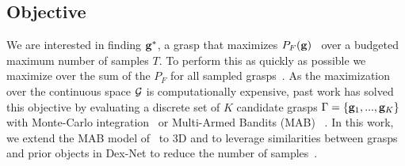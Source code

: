 \subsection{Objective}
We are interested in finding $\mathbf{g}^*$, a grasp that maximizes $P_F(\mathbf{g})$~\cite{kim2012physically, laskey2015bandits, mahler2015gp, weisz2012pose} over a budgeted maximum number of samples $T$.
To perform this as quickly as possible we maximize over the sum of the $P_F$ for all sampled grasps~\cite{laskey2015bandits, srinivas10gaussian}.
As the maximization over the continuous space $\mathcal{G}$ is computationally expensive, past work has solved this objective by evaluating a discrete set of $K$ candidate grasps $\Gamma = \left\{ \mathbf{g}_1, ..., \mathbf{g}_K \right\}$ with Monte-Carlo integration~\cite{kehoe2012toward, weisz2012pose} or Multi-Armed Bandits (MAB) ~\cite{laskey2015bandits}.
In this work, we extend the MAB model of~\cite{laskey2015bandits} to 3D and to leverage similarities between grasps and prior objects in Dex-Net to reduce the number of samples~\cite{hoffman2013exploiting, pandey2007multi}.
